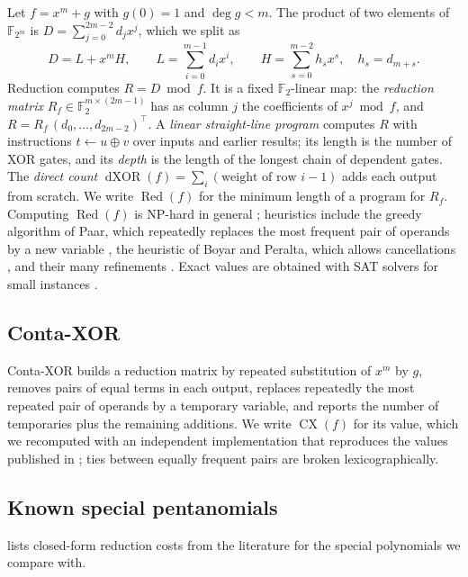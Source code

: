 \documentclass[11pt,a4paper]{article}
\theoremstyle{plain}
\theoremstyle{definition}
\newcommand{\F}{\mathbb{F}}
\newcommand{\Ftm}{\F_{2^m}}
\newcommand{\Red}{\operatorname{Red}}
\newcommand{\dX}{\operatorname{dXOR}}
\newcommand{\CX}{\operatorname{CX}}
\newcommand{\xor}{\oplus}
\begin{document}
Let $f=x^m+g$ with $g(0)=1$ and $\deg g<m$. The product of two elements of $\Ftm$ is
$D=\sum_{j=0}^{2m-2}d_jx^j$, which we split as
\begin{equation}\label{eq:split}
  D=L+x^mH,\qquad L=\sum_{i=0}^{m-1}d_ix^i,\qquad H=\sum_{s=0}^{m-2}h_sx^s,\quad h_s=d_{m+s}.
\end{equation}
Reduction computes $R=D\bmod f$. It is a fixed $\F_2$-linear map: the \emph{reduction
matrix} $R_f\in\F_2^{m\times(2m-1)}$ has as column $j$ the coefficients of
$x^j\bmod f$, and $R=R_f\,(d_0,\dots,d_{2m-2})^{\top}$. A \emph{linear straight-line
program} computes $R$ with instructions $t\gets u\xor v$ over inputs and earlier
results; its length is the number of XOR gates, and its \emph{depth} is the length of the
longest chain of dependent gates. The \emph{direct count}
$\dX(f)=\sum_i(\text{weight of row }i-1)$ adds each output from scratch. We write
$\Red(f)$ for the minimum length of a program for $R_f$. Computing $\Red(f)$ is NP-hard
in general \cite{BMP2013}; heuristics include the greedy algorithm of Paar, which
repeatedly replaces the most frequent pair of operands by a new variable
\cite{Paar1997}, the heuristic of Boyar and Peralta, which allows cancellations
\cite{BoyarPeralta2010}, and their many refinements
\cite{Kranz2017,Banik2019,TanPeyrin2020,Xiang2020,SunYangLi2025}. Exact values are
obtained with SAT solvers for small instances \cite{FuhsSK2010,Stoffelen2016}.

\subsection{Conta-XOR}

Conta-XOR \cite[Ch.~4]{Banegas2015} builds a reduction matrix by repeated substitution
of $x^m$ by $g$, removes pairs of equal terms in each output, replaces repeatedly the most
repeated pair of operands by a temporary variable, and reports the number of temporaries
plus the remaining additions. We write $\CX(f)$ for its value, which we recomputed with
an independent implementation that reproduces the values published in
\cite{Banegas2015}; ties between equally frequent pairs are broken lexicographically.

\subsection{Known special pentanomials}

 lists closed-form reduction costs from the literature for the special
polynomials we compare with.
\end{document}
